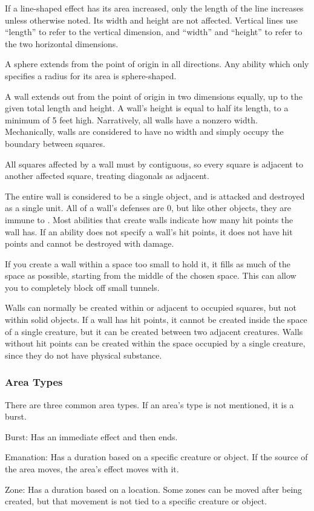     If a line-shaped effect has its area increased, only the length of the line increases unless otherwise noted.
    Its width and height are not affected.
    Vertical lines use ``length'' to refer to the vertical dimension, and ``width'' and ``height'' to refer to the two horizontal dimensions.

     A sphere extends from the point of origin in all directions.
    Any ability which only specifies a radius for its area is sphere-shaped.

     A wall extends out from the point of origin in two dimensions equally, up to the given total length and height.
    A wall's height is equal to half its length, to a minimum of 5 feet high.
    Narratively, all walls have a nonzero width.
    Mechanically, walls are considered to have no width and simply occupy the boundary between squares.

    All squares affected by a wall must by contiguous, so every square is adjacent to another affected square, treating diagonals as adjacent.

    The entire wall is considered to be a single object, and is attacked and destroyed as a single unit.
    All of a wall's defenses are 0, but like other objects, they are immune to .
    Most abilities that create walls indicate how many hit points the wall has.
    If an ability does not specify a wall's hit points, it does not have hit points and cannot be destroyed with damage.

    If you create a wall within a space too small to hold it, it fills as much of the space as possible, starting from the middle of the chosen space.
    This can allow you to completely block off small tunnels.

    Walls can normally be created within or adjacent to occupied squares, but not within solid objects.
    If a wall has hit points, it cannot be created inside the space of a single creature, but it can be created between two adjacent creatures.
    Walls without hit points can be created within the space occupied by a single creature, since they do not have physical substance.

    \subsubsection{Area Types}\label{Area Types}
      There are three common area types.
      If an area's type is not mentioned, it is a burst.
      \begin{raggeditemize}
        \item Burst: Has an immediate effect and then ends.
        \item Emanation: Has a duration based on a specific creature or object. If the source of the area moves, the area's effect moves with it.
        \item Zone: Has a duration based on a location. Some zones can be moved after being created, but that movement is not tied to a specific creature or object.
      \end{raggeditemize}

